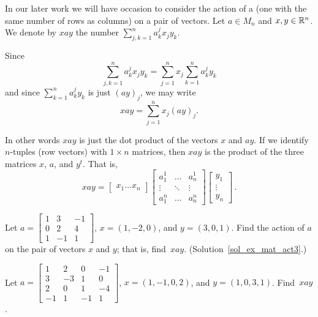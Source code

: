 \begin{defn}  In our later work we will have occasion to consider
the action of a
 (one with the same number of rows as columns) on a pair of vectors.  Let $a
\in  M_n$ and $x,y \in \mathbb{R}^n$.  We denote by $xay$ the number $\sum_{j,k=1}^n a_k^jx_jy_k$.

Since
 \[\sum_{j,k=1}^n a_k^jx_jy_k = \sum_{j=1}^n x_j \sum_{k=1}^na_k^jy_k\]
and since $\sum_{k=1}^na_k^jy_k$ is just $(ay)_j$, we may write
 \[xay = \sum_{j=1}^n x_j(ay)_j.\]
\end{defn}

In other words $xay$ is just the dot product of the vectors $x$ and
$ay$.  If we identify $n$-tuples (row vectors) with $1 \times n$
matrices, then $xay$ is the product of the three matrices $x$, $a$,
and $y^t$.  That is,
 \[ xay = \begin{bmatrix} x_1 \dots x_n \end{bmatrix}
   \begin{bmatrix}
        a_1^1 & \hdots & a_n^1  \\
       \vdots & \ddots & \vdots \\
        a_1^n & \hdots & a_n^n
   \end{bmatrix}
   \begin{bmatrix}
           y_1 \\
           \vdots \\
           y_n
   \end{bmatrix}\,.\]

\begin{exer}\label{ex_mat_act3} Let $a = \begin{bmatrix}
                                              1 & 3 & -1 \\
                                              0 & 2 & 4  \\
                                              1 & -1 & 1
                                         \end{bmatrix}$, $x = (1,-2,0)$, and $y = (3,0,1)$.
Find the action of $a$ on the pair of vectors $x$ and $y$; that is, find~$xay$.
(Solution~\ref{sol_ex_mat_act3}.)

\end{exer}

\begin{prob} Let $a = \begin{bmatrix}
                               1 &  2 &  0 & -1 \\
                               3 & -3 &  1 &  0 \\
                               2 &  0 &  1 & -4 \\
                              -1 &  1 & -1 &  1
                      \end{bmatrix}$, $x = (1,-1,0,2)$, and $y = (1,0,3,1)$.  Find~$xay$.
\end{prob}

